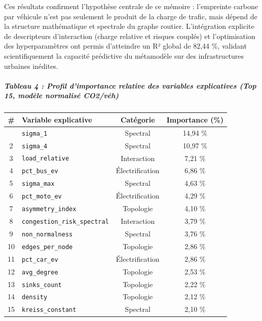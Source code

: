 \documentclass[10pt, a4paper]{article}
\newcounter{none}
\begin{document}
Ces résultats confirment l'hypothèse centrale de ce mémoire :
l'empreinte carbone par véhicule n'est pas seulement le produit de la
charge de trafic, mais dépend de la structure mathématique et spectrale
du graphe routier. L'intégration explicite de descripteurs d'interaction
(charge relative et risques couplés) et l'optimisation des
hyperparamètres ont permis d'atteindre un R² global de 82,44 \%,
validant scientifiquement la capacité prédictive du métamodèle sur des
infrastructures urbaines inédites.

\subparagraph{Tableau 4 : Profil d'importance relative des variables
explicatives (Top 15, modèle normalisé
CO2/véh)}\label{tableau-4-profil-dimportance-relative-des-variables-explicatives-top-15-moduxe8le-normalisuxe9-co2vuxe9h}

{\def\LTcaptype{none} %
\begin{longtable}[]{@{}clcc@{}}
\toprule\noalign{}
\# & Variable explicative & Catégorie & Importance (\%) \\
\midrule\noalign{}
\endhead
\bottomrule\noalign{}
\endlastfoot
1 & \texttt{sigma\_1} & Spectral & 14,94 \% \\
2 & \texttt{sigma\_4} & Spectral & 10,97 \% \\
3 & \texttt{load\_relative} & Interaction & 7,21 \% \\
4 & \texttt{pct\_bus\_ev} & Électrification & 6,86 \% \\
5 & \texttt{sigma\_max} & Spectral & 4,63 \% \\
6 & \texttt{pct\_moto\_ev} & Électrification & 4,29 \% \\
7 & \texttt{asymmetry\_index} & Topologie & 4,10 \% \\
8 & \texttt{congestion\_risk\_spectral} & Interaction & 3,79 \% \\
9 & \texttt{non\_normalness} & Spectral & 3,76 \% \\
10 & \texttt{edges\_per\_node} & Topologie & 2,86 \% \\
11 & \texttt{pct\_car\_ev} & Électrification & 2,86 \% \\
12 & \texttt{avg\_degree} & Topologie & 2,53 \% \\
13 & \texttt{sinks\_count} & Topologie & 2,22 \% \\
14 & \texttt{density} & Topologie & 2,12 \% \\
15 & \texttt{kreiss\_constant} & Spectral & 2,10 \% \\
\end{longtable}
}
\end{document}
